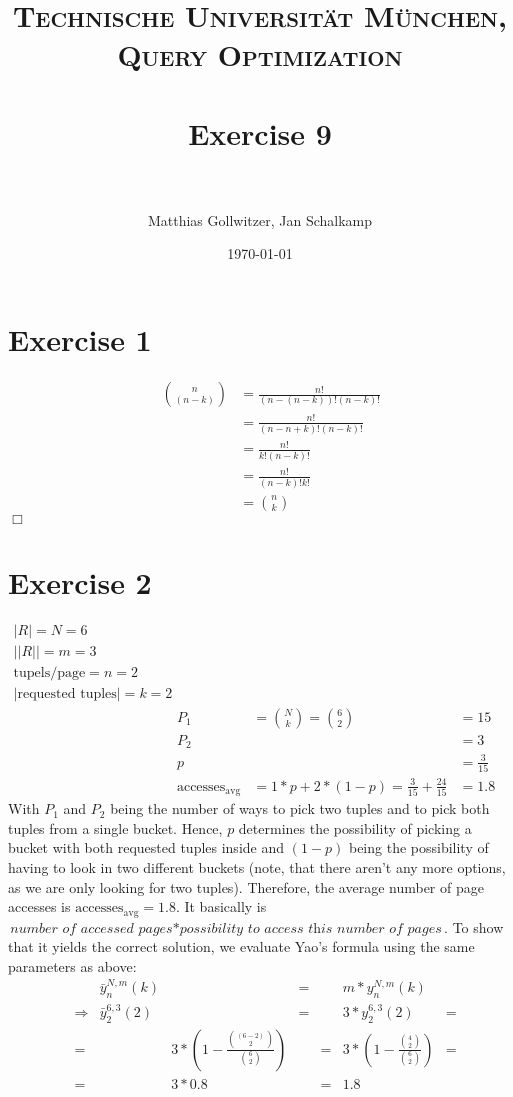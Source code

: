\documentclass[paper=a4, fontsize=11pt]{scrartcl} %
\title{	
\normalfont \normalsize 
\textsc{Technische Universit\"at M\"unchen, Query Optimization} \\ [25pt] %
\horrule{0.5pt} \\[0.4cm] %
\huge Exercise 9 \\ %
\horrule{2pt} \\[0.5cm] %
}
\author{Matthias Gollwitzer, Jan Schalkamp} %
\date{\normalsize\today} %
\numberwithin{equation}{section} %
\numberwithin{figure}{section} %
\numberwithin{table}{section} %
\begin{document}
\lstset{language=SQL}
\maketitle %


\section{Exercise 1}
	\begin{align*}
		&  & n \choose (n-k) &= \frac{n!}{(n-(n-k))! (n-k)!}\\
		& & &= \frac{n!}{(n-n+k)! (n-k)!}\\
		& & &= \frac{n!}{k! (n-k)!}\\
		& & &= \frac{n!}{(n-k)! k!}\\
		& & &= {n \choose k}
	\end{align*}
	\hfill $\Box$\\
	
	
\section{Exercise 2}
	\begin{align*}
		|R| = N = 6 &  & \\
		||R|| = m = 3& & &\\
		\text{tupels/page} = n = 2 & & & &\\
		|\text{requested tuples}| = k = 2 & & & &\\
		& P_1 &= {N \choose k} = {6 \choose 2}  &= 15 &\\
		& P_2 &  &= 3 &\\
		& p & &= \frac{3}{15} &\\
		& \text{accesses}_{\text{avg}} &= 1*p + 2*(1-p) = \frac{3}{15} + \frac{24}{15} &= 1.8 &
	\end{align*}
	With $P_1$ and $P_2$ being the number of ways to pick two tuples and to pick both tuples from a single bucket. Hence, $p$ determines the possibility of picking a bucket with both requested tuples inside and $(1-p)$ being the possibility of having to look in two different buckets (note, that there aren't any more options, as we are only looking for two tuples). Therefore, the average number of page accesses is $\text{accesses}_{\text{avg}} = 1.8$. It basically is $\textit{number of accessed pages}*\textit{possibility to access this number of pages}$. To show that it yields the correct solution, we evaluate Yao's formula using the same parameters as above:
	\begin{align*}
		& & \bar{y}^{N, m}_n (k)&  &=& & m*y^{N,m}_n (k) &\\
		& \Longrightarrow & \bar{y}^{6, 3}_2 (2)& &=& &3*y^{6,3}_2 (2) &= \\
		&= & & 3*\left( 1-\frac{{(6-2) \choose 2}}{{6 \choose 2}}\right) & &=& 3*\left(1-\frac{{4 \choose 2}}{{6 \choose 2}}\right)  &= \\
		&= & & 3*0.8 & &=& 1.8  &
	\end{align*}
	
\end{document}
